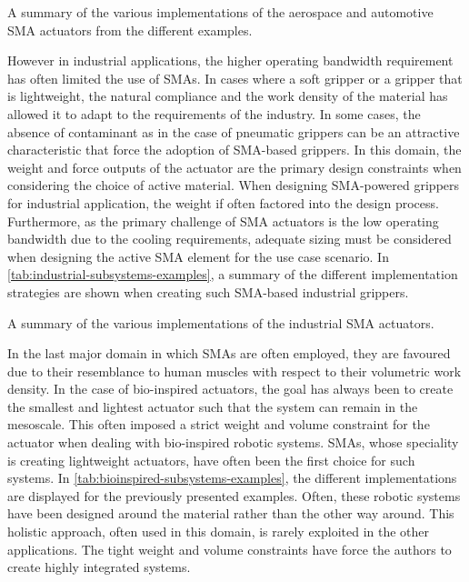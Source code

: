 \begin{table}[hbt]
    \centering
    \caption{A summary of the various implementations of the aerospace and automotive SMA actuators from the different examples.}
    
    \label{tab:auto-subsystems-examples}
\end{table}

However in industrial applications, the higher operating bandwidth requirement has often limited the use of SMAs. In cases where a soft gripper or a gripper that is lightweight, the natural compliance and the work density of the material has allowed it to adapt to the requirements of the industry. In some cases, the absence of contaminant as in the case of pneumatic grippers can be an attractive characteristic that force the adoption of SMA-based grippers. In this domain, the weight and force outputs of the actuator are the primary design constraints when considering the choice of active material. When designing SMA-powered grippers for industrial application, the weight if often factored into the design process. Furthermore, as the primary challenge of SMA actuators is the low operating bandwidth due to the cooling requirements, adequate sizing must be considered when designing the active SMA element for the use case scenario. In \cref{tab:industrial-subsystems-examples}, a summary of the different implementation strategies are shown when creating such SMA-based industrial grippers.

\begin{table}[hbt]
    \centering
    \caption{A summary of the various implementations of the industrial SMA actuators.}
    
    \label{tab:industrial-subsystems-examples}
\end{table}

In the last major domain in which SMAs are often employed, they are favoured due to their resemblance to human muscles with respect to their volumetric work density. In the case of bio-inspired actuators, the goal has always been to create the smallest and lightest actuator such that the system can remain in the mesoscale. This often imposed a strict weight and volume constraint for the actuator when dealing with bio-inspired robotic systems. SMAs, whose speciality is creating lightweight actuators, have often been the first choice for such systems. In \cref{tab:bioinspired-subsystems-examples}, the different implementations are displayed for the previously presented examples. Often, these robotic systems have been designed around the material rather than the other way around. This holistic approach, often used in this domain, is rarely exploited in the other applications. The tight weight and volume constraints have force the authors to create highly integrated systems.

